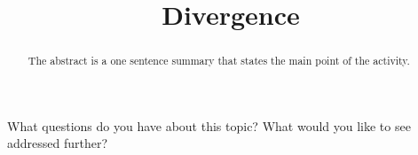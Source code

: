 \documentclass{ximera}
\title{Divergence}
\begin{document}
\begin{abstract}
  The abstract is a one sentence summary that states the main point of the activity.
\end{abstract}

\maketitle



What questions do you have about this topic?  What would you like to see addressed further?
\begin{free-response}
\end{free-response}
\end{document}
